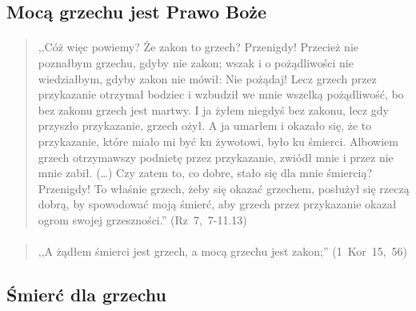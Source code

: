 \documentclass[10pt,a4paper,oneside]{article}
\begin{document}
\subsection{Mocą grzechu jest Prawo Boże}
\paragraph{}
\begin{quote}
,,Cóż więc powiemy? Że zakon to grzech? Przenigdy! Przecież nie poznałbym grzechu, gdyby nie zakon; wszak i o pożądliwości nie wiedziałbym, gdyby zakon nie mówił: Nie pożądaj! Lecz grzech przez przykazanie otrzymał bodziec i wzbudził we mnie wszelką pożądliwość, bo bez zakonu grzech jest martwy. I ja żyłem niegdyś bez zakonu, lecz gdy przyszło przykazanie, grzech ożył. A ja umarłem i okazało się, że to przykazanie, które miało mi być ku żywotowi, było ku śmierci. Albowiem grzech otrzymawszy podnietę przez przykazanie, zwiódł mnie i przez nie mnie zabił. (\ldots) Czy zatem to, co dobre, stało się dla mnie śmiercią? Przenigdy! To właśnie grzech, żeby się okazać grzechem, posłużył się rzeczą dobrą, by spowodować moją śmierć, aby grzech przez przykazanie okazał ogrom swojej grzeszności.'' \mbox{(Rz 7, 7-11.13)}
\end{quote}
\paragraph{}
\begin{quote}
,,A żądłem śmierci jest grzech, a mocą grzechu jest zakon;'' \mbox{(1 Kor 15, 56)}
\end{quote}
\subsection{Śmierć dla grzechu}
\end{document}
